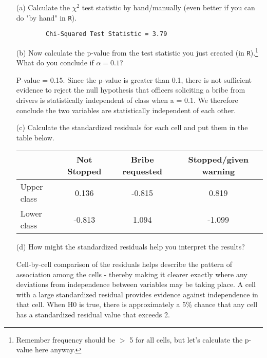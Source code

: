 \documentclass[12pt,letterpaper]{article}
\begin{document}
\begin{enumerate}
	
	\item [(a)]
	Calculate the $\chi^2$ test statistic by hand/manually (even better if you can do "by hand" in \texttt{R}).\\
	\vspace{0.1cm}
	
	
	\begin{verbatim}
		Chi-Squared Test Statistic = 3.79
	\end{verbatim} 
	
	
	\item [(b)]
	Now calculate the p-value from the test statistic you just created (in \texttt{R}).\footnote{Remember frequency should be $>$ 5 for all cells, but let's calculate the p-value here anyway.}  What do you conclude if $\alpha = 0.1$?\\
	
	\newpage
	
	
	\noindent
	P-value = 0.15. Since the p-value is greater than 0.1, there is not sufficient evidence to reject the null hypothesis that officers soliciting a bribe from drivers is statistically independent of class when a = 0.1. We therefore conclude the two variables are statistically independent of each other.
	
	
	\item [(c)] Calculate the standardized residuals for each cell and put them in the table below.
	\vspace{1cm}
	
	\begin{table}[h]
		\centering
		\begin{tabular}{l | c c c }
			& Not Stopped & Bribe requested & Stopped/given warning \\
			\hline
			Upper class  & 0.136 & -0.815 & 0.819 \\
			Lower class  & -0.813& 1.094 & -1.099 \\ 
		\end{tabular}
	\end{table}
	
	
	\vspace{1cm}
	\item [(d)] How might the standardized residuals help you interpret the results? 
	 
	\noindent
	 Cell-by-cell comparison of the residuals helps describe the pattern of association among the cells - thereby making it clearer exactly where any deviations from independence between variables may be taking place. A cell with a large standardized residual provides evidence against independence in that cell. When H0 is true, there is approximately a 5\% chance that any cell has a standardized residual value that exceeds 2.
	 

\end{enumerate}
\end{document}
